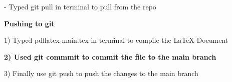 \documentclass[../main.tex]{subfiles}
\begin{document}
 \newline
 - Typed git pull in terminal to pull from the repo
\newline

\textbf{Pushing to git}
\newline



 1) Typed pdflatex main.tex in terminal to compile the LaTeX Document
 \newline

 \textbf{2) Used git commmit to commit the file to the main branch}
 \newline

 3) Finally use git push to push the changes to the main branch
 \newline
\end{document}
